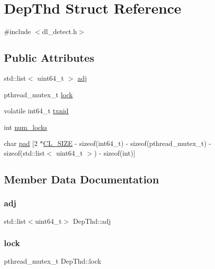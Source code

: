 \hypertarget{structDepThd}{}\section{Dep\+Thd Struct Reference}
\label{structDepThd}


{\ttfamily \#include $<$dl\+\_\+detect.\+h$>$}

\subsection*{Public Attributes}
\begin{DoxyCompactItemize}
\item 
std\+::list$<$ uint64\+\_\+t $>$ \hyperlink{structDepThd_a7580692f60495ac6615c0ca7051ab6ff}{adj}
\item 
pthread\+\_\+mutex\+\_\+t \hyperlink{structDepThd_a0ca28303dccde11fc96d37941a4c163e}{lock}
\item 
volatile int64\+\_\+t \hyperlink{structDepThd_ae02ea3a099f2e51b2c65b5ff5ace9d27}{txnid}
\item 
int \hyperlink{structDepThd_a427fb898ef48f93641eb37851562b42c}{num\+\_\+locks}
\item 
char \hyperlink{structDepThd_a0008931a52118db5349c61aba36f279b}{pad} \mbox{[}2 $\ast$\hyperlink{config_8h_aa18ff96566bf8c1f4cd38c1e7bc4ca80}{C\+L\+\_\+\+S\+I\+ZE} -\/ sizeof(int64\+\_\+t) -\/ sizeof(pthread\+\_\+mutex\+\_\+t) -\/ sizeof(std\+::list$<$ uint64\+\_\+t $>$) -\/ sizeof(int)\mbox{]}
\end{DoxyCompactItemize}


\subsection{Member Data Documentation}
\mbox{\label{structDepThd_a7580692f60495ac6615c0ca7051ab6ff}} 
\subsubsection{\texorpdfstring{adj}{adj}}
{\footnotesize\ttfamily std\+::list$<$uint64\+\_\+t$>$ Dep\+Thd\+::adj}

\mbox{\label{structDepThd_a0ca28303dccde11fc96d37941a4c163e}} 
\subsubsection{\texorpdfstring{lock}{lock}}
{\footnotesize\ttfamily pthread\+\_\+mutex\+\_\+t Dep\+Thd\+::lock}

